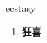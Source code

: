 
\begin{frame}
{\huge ecstasy}
\begin{center}
\begin{enumerate}\Large
  \item \textbf{狂喜}
\end{enumerate}
\end{center}
\end{frame}
